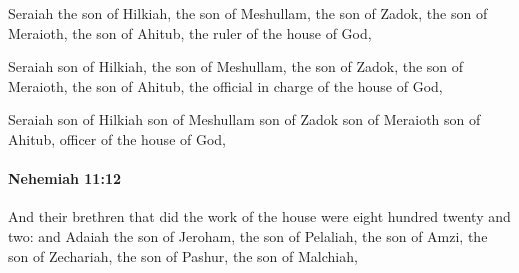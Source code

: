 			\begin{versebox}
					\item[BHS] 
					\item[LXX] 
					\item[ASV] Seraiah the son of Hilkiah, the son of Meshullam, the son of Zadok, the son of Meraioth, the son of Ahitub, the ruler of the house of God,
					\item[NIV] Seraiah son of Hilkiah, the son of Meshullam, the son of Zadok, the son of Meraioth, the son of Ahitub, the official in charge of the house of God,
					\item[NRSV] Seraiah son of Hilkiah son of Meshullam son of Zadok son of Meraioth son of Ahitub, officer of the house of God,
			\end{versebox}

		\paragraph{Nehemiah 11:12} %
			\label{NEHEMIAH-11-12}

			And their brethren that did the work of the house were eight hundred twenty and two: and Adaiah the son of Jeroham, the son of Pelaliah, the son of Amzi, the son of Zechariah, the son of Pashur, the son of Malchiah,

